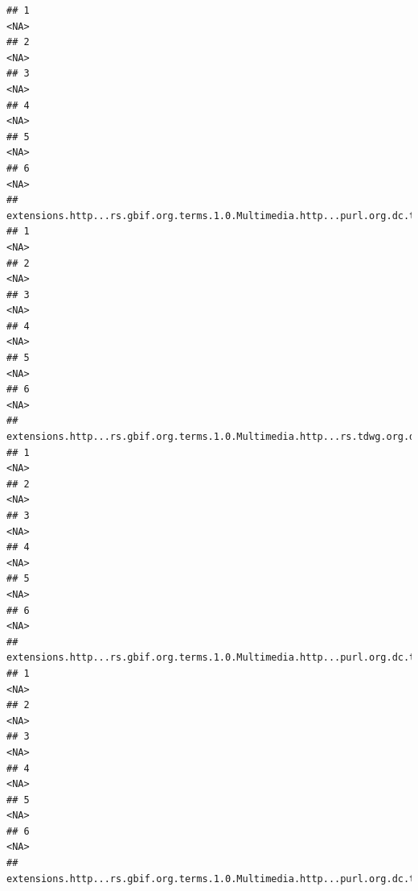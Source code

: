 \documentclass[
]{book}
\begin{document}
\begin{verbatim}
## 1                                                                                     <NA>
## 2                                                                                     <NA>
## 3                                                                                     <NA>
## 4                                                                                     <NA>
## 5                                                                                     <NA>
## 6                                                                                     <NA>
##   extensions.http...rs.gbif.org.terms.1.0.Multimedia.http...purl.org.dc.terms.type.7
## 1                                                                               <NA>
## 2                                                                               <NA>
## 3                                                                               <NA>
## 4                                                                               <NA>
## 5                                                                               <NA>
## 6                                                                               <NA>
##   extensions.http...rs.gbif.org.terms.1.0.Multimedia.http...rs.tdwg.org.dwc.terms.catalogNumber.7
## 1                                                                                            <NA>
## 2                                                                                            <NA>
## 3                                                                                            <NA>
## 4                                                                                            <NA>
## 5                                                                                            <NA>
## 6                                                                                            <NA>
##   extensions.http...rs.gbif.org.terms.1.0.Multimedia.http...purl.org.dc.terms.publisher.7
## 1                                                                                    <NA>
## 2                                                                                    <NA>
## 3                                                                                    <NA>
## 4                                                                                    <NA>
## 5                                                                                    <NA>
## 6                                                                                    <NA>
##   extensions.http...rs.gbif.org.terms.1.0.Multimedia.http...purl.org.dc.terms.license.7

\end{verbatim}
\end{document}
